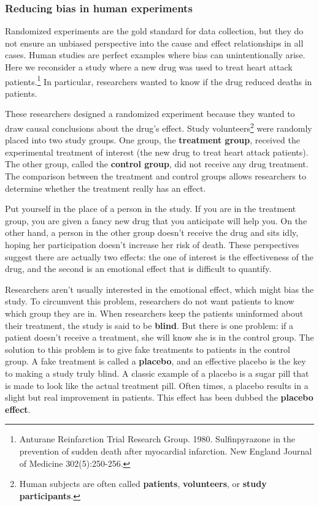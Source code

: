 \documentclass[
  letterpaper,
  DIV=11,
  numbers=noendperiod]{scrreprt}
\begin{document}
\subsubsection{Reducing bias in human
experiments}\label{reducing-bias-in-human-experiments}

Randomized experiments are the gold standard for data collection, but
they do not ensure an unbiased perspective into the cause and effect
relationships in all cases. Human studies are perfect examples where
bias can unintentionally arise. Here we reconsider a study where a new
drug was used to treat heart attack patients.\footnote{Anturane
  Reinfarction Trial Research Group. 1980. Sulfinpyrazone in the
  prevention of sudden death after myocardial infarction. New England
  Journal of Medicine 302(5):250-256.} In particular, researchers wanted
to know if the drug reduced deaths in patients.

These researchers designed a randomized experiment because they wanted
to draw causal conclusions about the drug's effect. Study
volunteers\footnote{Human subjects are often called \textbf{patients},
  \textbf{volunteers}, or \textbf{study participants}.} were randomly
placed into two study groups. One group, the \textbf{treatment group},
received the experimental treatment of interest (the new drug to treat
heart attack patients). The other group, called the \textbf{control
group}, did not receive any drug treatment. The comparison between the
treatment and control groups allows researchers to determine whether the
treatment really has an effect.

Put yourself in the place of a person in the study. If you are in the
treatment group, you are given a fancy new drug that you anticipate will
help you. On the other hand, a person in the other group doesn't receive
the drug and sits idly, hoping her participation doesn't increase her
risk of death. These perspectives suggest there are actually two
effects: the one of interest is the effectiveness of the drug, and the
second is an emotional effect that is difficult to quantify.

Researchers aren't usually interested in the emotional effect, which
might bias the study. To circumvent this problem, researchers do not
want patients to know which group they are in. When researchers keep the
patients uninformed about their treatment, the study is said to be
\textbf{blind}. But there is one problem: if a patient doesn't receive a
treatment, she will know she is in the control group. The solution to
this problem is to give fake treatments to patients in the control
group. A fake treatment is called a \textbf{placebo}, and an effective
placebo is the key to making a study truly blind. A classic example of a
placebo is a sugar pill that is made to look like the actual treatment
pill. Often times, a placebo results in a slight but real improvement in
patients. This effect has been dubbed the \textbf{placebo effect}.
\end{document}
